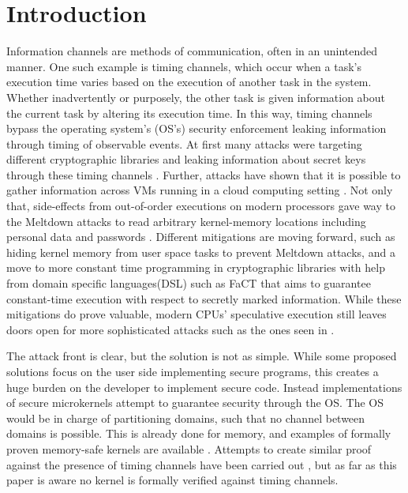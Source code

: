 \section{Introduction}
Information channels are methods of communication, often in an unintended
manner. One such example is timing channels, which occur when a task's
execution time varies based on the execution of another task in the system.
Whether inadvertently or purposely, the other task is given information about
the current task by altering its execution time.  In this way, timing channels
bypass the operating system's (OS's) security enforcement leaking information
through timing of observable events. At first many attacks were targeting
different cryptographic libraries and leaking information about secret keys
through these timing channels \cite{dhem2000, aciicmez2005}. Further, attacks
have shown that it is possible to gather information across VMs running in a
cloud computing setting \cite{ristenpart2009}. Not only that, side-effects from
out-of-order executions on modern processors gave way to the Meltdown attacks
to read arbitrary kernel-memory locations including personal data and passwords
\cite{lipp2018}. Different mitigations are moving forward, such as hiding
kernel memory from user space tasks \cite{corbet2017} to prevent Meltdown
attacks, and a move to more constant time programming in cryptographic
libraries with help from domain specific languages(DSL) such as FaCT
\cite{cauligi2019} that aims to guarantee constant-time execution with respect
to secretly marked information. While these mitigations do prove valuable,
modern CPUs' speculative execution still leaves doors open for more
sophisticated attacks such as the ones seen in \cite{kocher2019}.

The attack front is clear, but the solution is not as simple. While some
proposed solutions focus on the user side implementing secure programs, this
creates a huge burden on the developer to implement secure code. Instead
implementations of secure microkernels \cite{karlsson2025, ge2019} attempt to
guarantee security through the OS. The OS would be in charge of partitioning
domains, such that no channel between domains is possible. This is already done
for memory, and examples of formally proven memory-safe kernels are available
\cite{murray2013}. Attempts to create similar proof against the presence of
timing channels have been carried out \cite{buckley2023}, but as far as this
paper is aware no kernel is formally verified against timing channels.


